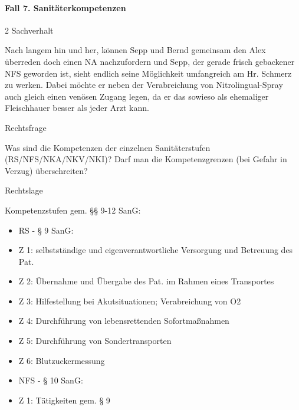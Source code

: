 \documentclass{article}
\begin{document}
\paragraph{Fall 7. Sanit\"aterkompetenzen}
\begin{multicols}{2}
Sachverhalt

Nach langem hin und her, k\"onnen Sepp und Bernd gemeinsam den Alex
\"uberreden doch einen NA nachzufordern und Sepp, der gerade frisch
gebackener NFS geworden ist, sieht endlich seine M\"oglichkeit
umfangreich am Hr. Schmerz zu werken. Dabei m\"ochte er neben der
Verabreichung von Nitrolingual-Spray auch gleich einen ven\"osen Zugang
legen, da er das sowieso als ehemaliger Fleischhauer besser als jeder
Arzt kann.

Rechtsfrage

Was sind die Kompetenzen der einzelnen Sanit\"aterstufen
(RS/NFS/NKA/NKV/NKI)? Darf man die Kompetenzgrenzen (bei Gefahr in
Verzug) \"uberschreiten?

Rechtslage

Kompetenzstufen gem. {\S}{\S} 9-12 SanG:

\begin{itemize}
\item RS - {\S} 9 SanG:

\end{itemize}
\begin{itemize}
\item Z 1: selbstst\"andige und eigenverantwortliche Versorgung und
Betreuung des Pat.

\item Z 2: \"Ubernahme und \"Ubergabe des Pat. im Rahmen eines
Transportes

\item Z 3: Hilfestellung bei Akutsituationen; Verabreichung von O2

\item Z 4: Durchf\"uhrung von lebensrettenden Sofortma{\ss}nahmen

\item Z 5: Durchf\"uhrung von Sondertransporten

\item Z 6: Blutzuckermessung

\end{itemize}
\begin{itemize}
\item NFS - {\S} 10 SanG:

\end{itemize}
\begin{itemize}
\item Z 1: T\"atigkeiten gem. {\S} 9


\end{itemize}
\end{multicols}
\end{document}
